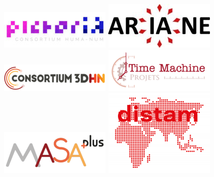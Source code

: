 \documentclass[
  letterpaper,
  DIV=11,
  numbers=noendperiod]{scrreport}
\begin{document}
\begin{figure}

\begin{minipage}{0.33\linewidth}
\includegraphics{IMG/Pictoria-200x70.jpg}\end{minipage}%
%
\begin{minipage}{0.33\linewidth}
\includegraphics{IMG/Logo_ARIANE-200x86.jpg}\end{minipage}%
%
\begin{minipage}{0.33\linewidth}
\includegraphics{IMG/logo-3DHN-200x52.png}\end{minipage}%
\newline
\begin{minipage}{0.33\linewidth}
\includegraphics{IMG/logo-PTM-png-200x80.png}\end{minipage}%
%
\begin{minipage}{0.33\linewidth}
\includegraphics{IMG/logo_MASAplus-200x81.png}\end{minipage}%
%
\begin{minipage}{0.33\linewidth}
\includegraphics{IMG/LOGO-DISTAM-sans-texte-200x158.png}\end{minipage}%

\end{figure}
\end{document}
